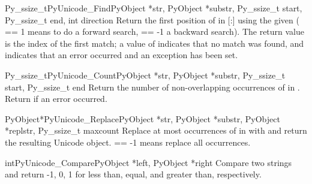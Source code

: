 \begin{cfuncdesc}{Py_ssize_t}{PyUnicode_Find}{PyObject *str,
                                       PyObject *substr,
                                       Py_ssize_t start,
                                       Py_ssize_t end,
                                       int direction}
  Return the first position of  in
  [:] using the given 
  ( == 1 means to do a forward search,
   == -1 a backward search).  The return value is the
  index of the first match; a value of  indicates that no
  match was found, and  indicates that an error occurred and
  an exception has been set.
\end{cfuncdesc}

\begin{cfuncdesc}{Py_ssize_t}{PyUnicode_Count}{PyObject *str,
                                        PyObject *substr,
                                        Py_ssize_t start,
                                        Py_ssize_t end}
  Return the number of non-overlapping occurrences of  in
  .  Return  if an
  error occurred.
\end{cfuncdesc}

\begin{cfuncdesc}{PyObject*}{PyUnicode_Replace}{PyObject *str,
                                                PyObject *substr,
                                                PyObject *replstr,
                                                Py_ssize_t maxcount}
  Replace at most  occurrences of  in
   with  and return the resulting Unicode object.
   == -1 means replace all occurrences.
\end{cfuncdesc}

\begin{cfuncdesc}{int}{PyUnicode_Compare}{PyObject *left, PyObject *right}
  Compare two strings and return -1, 0, 1 for less than, equal, and
  greater than, respectively.
\end{cfuncdesc}


